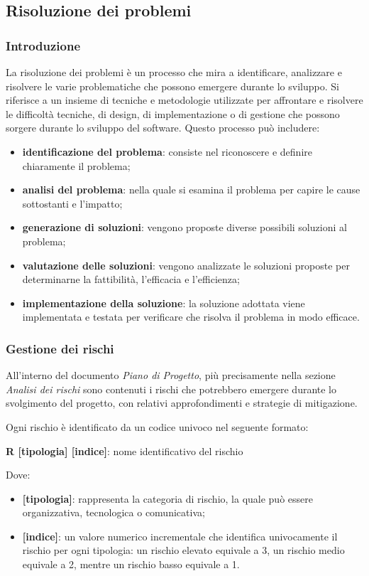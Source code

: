 \subsection{Risoluzione dei problemi}
\subsubsection{Introduzione}
La risoluzione dei problemi è un processo che mira a identificare, analizzare e risolvere le varie problematiche che possono emergere durante lo sviluppo. Si riferisce a un insieme di tecniche e metodologie utilizzate per affrontare e risolvere le difficoltà tecniche, di design, di implementazione o di gestione che possono sorgere durante lo sviluppo del software. Questo processo può includere:
\begin{itemize}
	\item \textbf{identificazione del problema}: consiste nel riconoscere e definire chiaramente il problema;
	\item \textbf{analisi del problema}: nella quale si esamina il problema per capire le cause sottostanti e l'impatto;
	\item \textbf{generazione di soluzioni}: vengono proposte diverse possibili soluzioni al problema;
	\item \textbf{valutazione delle soluzioni}: vengono analizzate le soluzioni proposte per determinarne la fattibilità, l'efficacia e l'efficienza;
	\item \textbf{implementazione della soluzione}: la soluzione adottata viene implementata e testata per verificare che risolva il problema in modo efficace.
\end{itemize}

\subsubsection{Gestione dei rischi}
All'interno del documento \textit{Piano di Progetto}, più precisamente nella sezione \textit{Analisi dei rischi} sono contenuti i rischi che potrebbero emergere durante lo svolgimento del progetto, con relativi approfondimenti e strategie di mitigazione.

Ogni rischio è identificato da un codice univoco nel seguente formato:
\begin{center}
	\textbf{R [tipologia] [indice]}: nome identificativo del rischio
\end{center}
Dove:
\begin{itemize}
	\item \textbf{[tipologia]}: rappresenta la categoria di rischio, la quale può essere organizzativa, tecnologica o comunicativa;
	\item \textbf{[indice]}: un valore numerico incrementale che identifica univocamente il rischio per ogni tipologia: un rischio elevato equivale a 3, un rischio medio equivale a 2, mentre un rischio basso equivale a 1.
\end{itemize}

